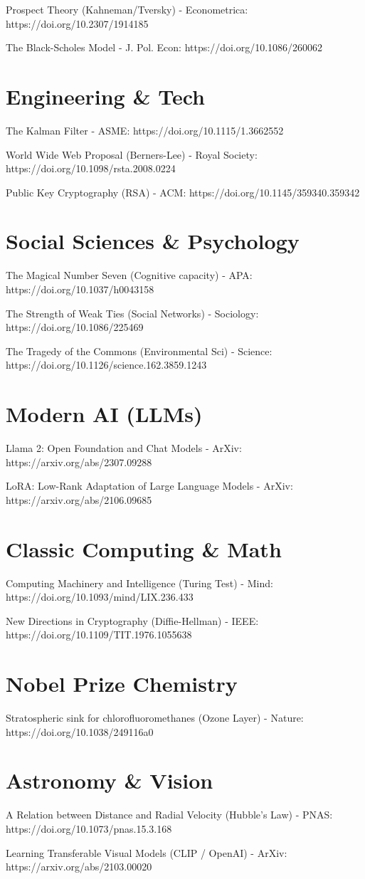 \documentclass[12pt]{article}
\begin{document}
Prospect Theory (Kahneman/Tversky) - Econometrica:
https://doi.org/10.2307/1914185

The Black-Scholes Model - J. Pol. Econ:
https://doi.org/10.1086/260062

\section{Engineering \& Tech}
The Kalman Filter - ASME:
https://doi.org/10.1115/1.3662552

World Wide Web Proposal (Berners-Lee) - Royal Society:
https://doi.org/10.1098/rsta.2008.0224

Public Key Cryptography (RSA) - ACM:
https://doi.org/10.1145/359340.359342

\section{Social Sciences \& Psychology}
The Magical Number Seven (Cognitive capacity) - APA:
https://doi.org/10.1037/h0043158

The Strength of Weak Ties (Social Networks) - Sociology:
https://doi.org/10.1086/225469

The Tragedy of the Commons (Environmental Sci) - Science:
https://doi.org/10.1126/science.162.3859.1243

\section{Modern AI (LLMs)}
 Llama 2: Open Foundation and Chat Models - ArXiv:
https://arxiv.org/abs/2307.09288

LoRA: Low-Rank Adaptation of Large Language Models - ArXiv:
https://arxiv.org/abs/2106.09685

\section{Classic Computing \& Math}
Computing Machinery and Intelligence (Turing Test) - Mind:
https://doi.org/10.1093/mind/LIX.236.433

 New Directions in Cryptography (Diffie-Hellman) - IEEE:
https://doi.org/10.1109/TIT.1976.1055638

\section{Nobel Prize Chemistry}
Stratospheric sink for chlorofluoromethanes (Ozone Layer) - Nature:
https://doi.org/10.1038/249116a0

\section{Astronomy \& Vision}
A Relation between Distance and Radial Velocity (Hubble's Law) - PNAS:
https://doi.org/10.1073/pnas.15.3.168

Learning Transferable Visual Models (CLIP / OpenAI) - ArXiv:
https://arxiv.org/abs/2103.00020
\end{document}
